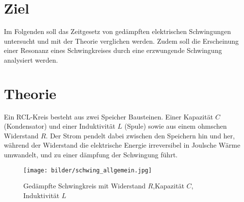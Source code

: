 \newpage

\section*{Ziel}
Im Folgenden soll das Zeitgesetz von gedämpften elektrischen Schwingungen untersucht und mit
der Theorie verglichen werden.
Zudem soll die Erscheinung einer Resonanz eines Schwingkreises 
durch eine erzwungende Schwingung analysiert werden.

\section{Theorie}
Ein RCL-Kreis besteht aus zwei Speicher Bausteinen. Einer Kapazität $C$ (Kondensator)
und einer Induktivität $L$ (Spule) sowie aus einem ohmschen Widerstand $R$.
Der Strom pendelt dabei zwischen den Speichern hin und her, während der Widerstand die 
elektrische Energie irreversibel in Joulsche Wärme umwandelt, und zu einer dämpfung der
Schwingung führt.

\begin{figure}
    \centering
    \texttt{[image: bilder/schwing\_allgemein.jpg]}
    \label{fig:schwing_allgemein}
    \caption{Gedämpfte Schwingkreis mit Widerstand $R$,Kapazität $C$, Induktivität $L$ \cite[284]{Anleitung}}
\end{figure}

